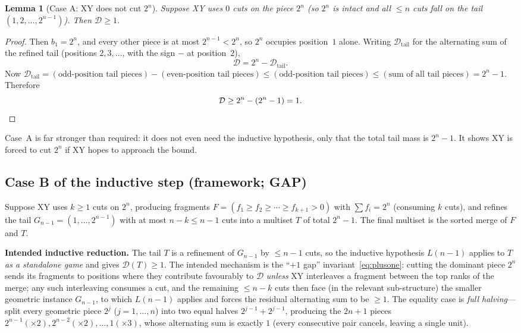 \documentclass[11pt]{article}
\newtheorem{lemma}[theorem]{Lemma}
\theoremstyle{definition}
\newcommand{\D}{\mathcal{D}}
\begin{document}
\begin{lemma}[Case A: XY does not cut $2^n$]\label{lem:caseA}
Suppose XY uses $0$ cuts on the piece $2^n$ (so $2^n$ is intact and all $\le n$
cuts fall on the tail $(1,2,\dots,2^{n-1})$). Then $\D\ge 1$.
\end{lemma}
\begin{proof}
Then $b_1=2^n$, and every other piece is at most $2^{n-1}<2^n$, so $2^n$
occupies position~$1$ alone. Writing $\D_{\text{tail}}$ for the alternating
sum of the refined tail (positions $2,3,\dots$, with the sign $-$ at
position~$2$),
\[
\D=2^n-\D_{\text{tail}}.
\]
Now $\D_{\text{tail}}=(\text{odd-position tail pieces})-(\text{even-position tail
pieces})\le(\text{odd-position tail pieces})\le(\text{sum of all tail pieces})
=2^n-1$. Therefore
\[
\D\ge 2^n-(2^n-1)=1. \qedhere
\]
\end{proof}

Case~A is far stronger than required: it does not even need the inductive
hypothesis, only that the total tail mass is $2^n-1$. It shows XY is forced to
cut $2^n$ if XY hopes to approach the bound.

\subsection{Case B of the inductive step (framework; GAP)}

Suppose XY uses $k\ge 1$ cuts on $2^n$, producing fragments
$F=(f_1\ge f_2\ge\cdots\ge f_{k+1}>0)$ with $\sum f_i=2^n$ (consuming $k$
cuts), and refines the tail $G_{n-1}=(1,\dots,2^{n-1})$ with at most
$n-k\le n-1$ cuts into a multiset $T$ of total $2^n-1$. The final multiset is
the sorted merge of $F$ and $T$.

\textbf{Intended inductive reduction.} The tail $T$ is a refinement of
$G_{n-1}$ by $\le n-1$ cuts, so the inductive hypothesis $L(n-1)$ applies to
$T$ \emph{as a standalone game} and gives $\D(T)\ge 1$. The intended mechanism
is the ``$+1$ gap'' invariant~\eqref{eq:plusone}: cutting the dominant piece
$2^n$ sends its fragments to positions where they contribute favourably to $\D$
\emph{unless} XY interleaves a fragment between the top ranks of the merge;
any such interleaving consumes a cut, and the remaining $\le n-k$ cuts then
face (in the relevant sub-structure) the smaller geometric instance $G_{n-1}$,
to which $L(n-1)$ applies and forces the residual alternating sum to be $\ge 1$.
The equality case is \emph{full halving}---split every geometric piece $2^j$
($j=1,\dots,n$) into two equal halves $2^{j-1}+2^{j-1}$, producing the $2n+1$
pieces $2^{n-1}(\times2),2^{n-2}(\times2),\dots,1(\times3)$, whose alternating
sum is exactly $1$ (every consecutive pair cancels, leaving a single unit).
\end{document}
